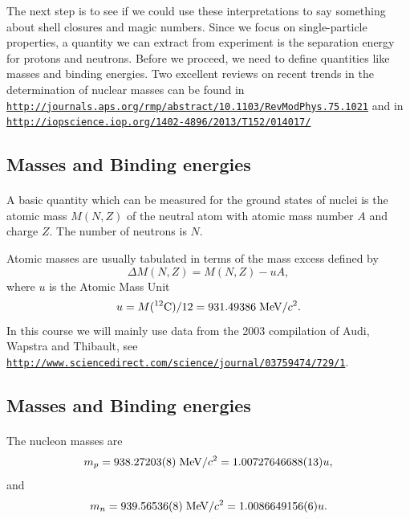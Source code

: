 \documentclass[%
twoside,                 %
final,                   %
10pt]{article}
\begin{document}
\noindent
The next step is to see if we could use these interpretations to say something about shell closures and magic numbers. Since we focus on single-particle properties, a quantity we can extract from experiment is the separation energy for protons and neutrons. Before we proceed, we need to define quantities like masses and binding energies.   Two excellent reviews on 
recent trends in the determination of nuclear masses can be found in \href{{http://journals.aps.org/rmp/abstract/10.1103/RevModPhys.75.1021}}{\nolinkurl{http://journals.aps.org/rmp/abstract/10.1103/RevModPhys.75.1021}} and in \href{{http://iopscience.iop.org/1402-4896/2013/T152/014017/}}{\nolinkurl{http://iopscience.iop.org/1402-4896/2013/T152/014017/}}




\subsection*{Masses and Binding energies}

\paragraph{}
A basic quantity which can be measured for the ground states of nuclei is the atomic mass $M(N, Z)$ of the neutral atom with atomic mass number $A$ and charge $Z$. The number of neutrons is $N$.

Atomic masses are usually tabulated in terms of the mass excess defined by
\[
\Delta M(N, Z) =  M(N, Z) - uA,
\]
where $u$ is the Atomic Mass Unit 
\[
u = M(^{12}\mathrm{C})/12 = 931.49386 \hspace{0.1cm} \mathrm{MeV}/c^2.
\]
In this course we will mainly use 
data from the 2003 compilation of Audi, Wapstra and Thibault, see \href{{http://www.sciencedirect.com/science/journal/03759474/729/1}}{\nolinkurl{http://www.sciencedirect.com/science/journal/03759474/729/1}}.



\subsection*{Masses and Binding energies}

\paragraph{}
The nucleon masses are
\[
m_p = 938.27203(8)\hspace{0.1cm} \mathrm{MeV}/c^2 = 1.00727646688(13)u,
\] 
and
\[
m_n = 939.56536(8)\hspace{0.1cm} \mathrm{MeV}/c^2 = 1.0086649156(6)u.
\]
\end{document}
